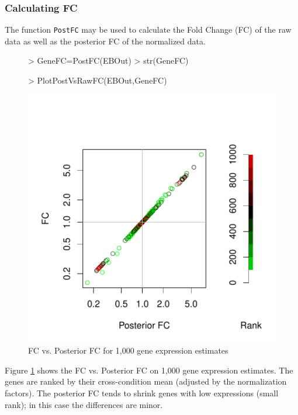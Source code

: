 \documentclass{article}
\begin{document}
\subsubsection{Calculating FC}
\label{sec:detailedgenedefc}
The function \verb+PostFC+ may be used to calculate the Fold Change (FC) 
of the raw data as well as the posterior FC of the normalized data.
\begin{figure}[h!]
\centering
\begin{Schunk}
\begin{Sinput}
> GeneFC=PostFC(EBOut)
> str(GeneFC)
\end{Sinput}
\begin{Sinput}
> PlotPostVsRawFC(EBOut,GeneFC)
\end{Sinput}
\end{Schunk}
\includegraphics{EBSeq_Vignette-021}
\caption{
FC vs. Posterior FC for 1,000 gene expression estimates}
\label{fig:GeneFC}
\end{figure}
Figure \ref{fig:GeneFC} shows the FC vs. Posterior FC on 1,000 gene expression estimates. 
The genes are ranked by their cross-condition mean (adjusted by the normalization factors). 
The posterior FC tends to shrink genes with low expressions (small rank); in this case the differences
are minor. 
\end{document}
